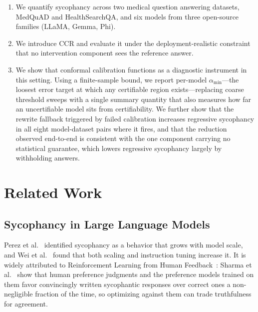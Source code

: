 \documentclass[sigconf, review, anonymous]{acmart}
\begin{document}
\begin{enumerate}
    \item We quantify sycophancy across two medical question answering
    datasets, MedQuAD and HealthSearchQA, and six models from three
    open-source families (LLaMA, Gemma, Phi).

    \item We introduce CCR and evaluate it under the deployment-realistic
    constraint that no intervention component sees the reference answer.

    \item We show that conformal calibration functions as a diagnostic
    instrument in this setting. Using a finite-sample bound, we
    report per-model $\alpha_{\min}$---the loosest error target at which any
    certifiable region exists---replacing coarse threshold sweeps with a single summary quantity that also measures how far an uncertifiable model
    sits from certifiability. We further show that the rewrite fallback
    triggered by failed calibration increases regressive sycophancy in all
    eight model-dataset pairs where it fires, and that the reduction
    observed end-to-end is consistent with the one component carrying no
    statistical guarantee, which lowers regressive sycophancy largely by
    withholding answers.
\end{enumerate}

\section{Related Work}

\subsection{Sycophancy in Large Language Models}

Perez et al.~\cite{perez2023discovering} identified sycophancy as a
behavior that grows with model scale, and Wei et al.~\cite{wei2023simple} found that both
scaling and instruction tuning increase it. It is widely attributed to
Reinforcement Learning from Human Feedback~\cite{ouyang2022training}:
Sharma et al.~\cite{sharma2024towards} show that human preference judgments
and the preference models trained on them favor convincingly written
sycophantic responses over correct ones a non-negligible fraction of the
time, so optimizing against them can trade truthfulness for agreement.
\end{document}

